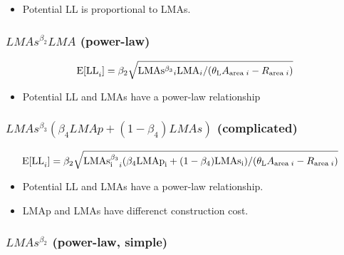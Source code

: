 \documentclass[12pt,]{article}
\providecommand{\tightlist}{%
  \setlength{\itemsep}{0pt}\setlength{\parskip}{0pt}}
\begin{document}
\begin{itemize}
\tightlist
\item
  Potential LL is proportional to LMAs.
\end{itemize}

\subsubsection{\texorpdfstring{\(LMAs^{\beta_2}LMA\)
(power-law)}{LMAs\^{}\{\textbackslash{}beta\_2\}LMA (power-law)}}\label{lmasbeta_2lma-power-law}

\begin{align}
  {\rm E[LL}_{i}] &=\beta_{2} \sqrt{{\rm LMAs^{\beta_3}}_{i}{\rm LMA}_{i}
  / (\theta_{\rm L} A_{{\rm area} \; i} - R_{{\rm area} \; i})} \notag \\
  \label{eq:power}
\end{align}

\begin{itemize}
\tightlist
\item
  Potential LL and LMAs have a power-law relationship
\end{itemize}

\subsubsection{\texorpdfstring{\(LMAs^{\beta_3}(\beta_4 LMAp + (1 - \beta_4) LMAs)\)
(complicated)}{LMAs\^{}\{\textbackslash{}beta\_3\}(\textbackslash{}beta\_4 LMAp + (1 - \textbackslash{}beta\_4) LMAs) (complicated)}}\label{lmasbeta_3beta_4-lmap-1---beta_4-lmas-complicated}

\begin{align}
  {\rm E[LL}_{i}] &=\beta_{2} \sqrt{{\rm {LMAs}_i^{\beta_3}}_{i}{(\beta_4 \rm {LMAp}_i + (1 - \beta_4) \rm {LMAs_i})}
  / (\theta_{\rm L} A_{{\rm area} \; i} - R_{{\rm area} \; i})} \label{eq:comp}
\end{align}

\begin{itemize}
\tightlist
\item
  Potential LL and LMAs have a power-law relationship.
\item
  LMAp and LMAs have differenct construction cost.
\end{itemize}

\subsubsection{\texorpdfstring{\(LMAs^{\beta_2}\) (power-law,
simple)}{LMAs\^{}\{\textbackslash{}beta\_2\} (power-law, simple)}}\label{lmasbeta_2-power-law-simple}
\end{document}
